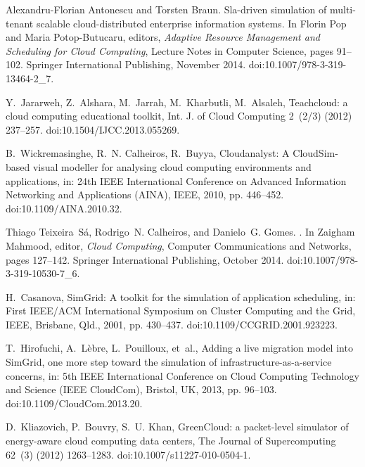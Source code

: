 \documentclass[sort, compress, 5p]{elsarticle}
\begin{document}
\begin{thebibliography}{10}
Alexandru-Florian Antonescu and Torsten Braun.
\newblock Sla-driven simulation of multi-tenant scalable cloud-distributed
enterprise information systems.
\newblock In Florin Pop and Maria Potop-Butucaru, editors, {\em Adaptive
	Resource Management and Scheduling for Cloud Computing}, Lecture Notes in
Computer Science, pages 91--102. Springer International Publishing, November
2014.
\newblock doi:10.1007/978-3-319-13464-2\_7.

Y.~Jararweh, Z.~Alshara, M.~Jarrah, M.~Kharbutli, M.~Alsaleh, Teachcloud: a
  cloud computing educational toolkit, Int. J. of Cloud Computing 2~(2/3)
  (2012) 237--257.
\newblock doi:10.1504/IJCC.2013.055269.

B.~Wickremasinghe, R.~N. Calheiros, R.~Buyya, Cloudanalyst: A {CloudSim}-based
  visual modeller for analysing cloud computing environments and applications,
  in: 24th IEEE International Conference on Advanced Information Networking and
  Applications (AINA), IEEE, 2010, pp. 446--452.
\newblock doi:10.1109/AINA.2010.32.

Thiago Teixeira~S\'a, Rodrigo~N. Calheiros, and Danielo~G. Gomes.
.
\newblock In Zaigham Mahmood, editor, {\em Cloud Computing}, Computer
Communications and Networks, pages 127--142. Springer International
Publishing, October 2014.
\newblock doi:10.1007/978-3-319-10530-7\_6.

H.~Casanova, {SimGrid}: A toolkit for the simulation of application scheduling,
  in: First IEEE/ACM International Symposium on Cluster Computing and the Grid,
  IEEE, Brisbane, Qld., 2001, pp. 430--437.
\newblock doi:10.1109/CCGRID.2001.923223.

T.~Hirofuchi, A.~L{\`e}bre, L.~Pouilloux, et~al., Adding a live migration model
  into {SimGrid}, one more step toward the simulation of
  infrastructure-as-a-service concerns, in: 5th IEEE International Conference
  on Cloud Computing Technology and Science (IEEE CloudCom), Bristol, UK, 2013,
  pp. 96--103.
\newblock doi:10.1109/CloudCom.2013.20.

D.~Kliazovich, P.~Bouvry, S.~U. Khan, {GreenCloud}: a packet-level simulator of
  energy-aware cloud computing data centers, The Journal of Supercomputing
  62~(3) (2012) 1263--1283.
\newblock doi:10.1007/s11227-010-0504-1.


\end{thebibliography}
\end{document}

